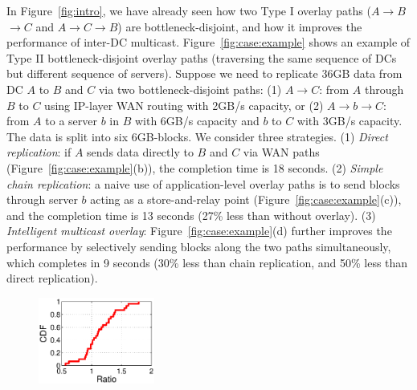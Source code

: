 In Figure~\ref{fig:intro}, we have already seen how two Type I overlay 
paths ($A$$\rightarrow$$B$$\rightarrow$$C$ and
$A$$\rightarrow$$C$$\rightarrow$$B$) are bottleneck-disjoint,
and how it improves the performance of inter-DC multicast.
Figure~\ref{fig:case:example} shows an example
of Type II bottleneck-disjoint overlay paths
(traversing the same sequence of DCs but different sequence of 
servers). Suppose we need to replicate 36GB data from DC $A$
to $B$ and $C$ via two bottleneck-disjoint paths:
(1) $A$$\rightarrow$$C$:
from $A$ through $B$ to $C$ using IP-layer WAN routing with
2GB/s capacity, or
(2) $A$$\rightarrow$$b$$\rightarrow$$C$: from $A$ to a server
$b$ in $B$ with
6GB/s capacity and $b$ to $C$ with 3GB/s capacity.
The data is split into six 6GB-blocks.
We consider three strategies.
(1) {\em Direct replication}:
if $A$ sends data directly to $B$ and $C$ via WAN paths
(Figure~\ref{fig:case:example}(b)),
the completion time is 18 seconds.
(2) {\em Simple chain replication}:
a naive use of application-level overlay paths
is to send blocks through server $b$ acting as a
store-and-relay point
(Figure~\ref{fig:case:example}(c)),
and the completion time is 13 seconds (27\% less than without overlay).
(3) {\em Intelligent multicast overlay}:
Figure~\ref{fig:case:example}(d) further improves the performance by
selectively sending blocks along the two paths simultaneously,
which completes in 9 seconds (30\% less than chain replication,
and 50\% less than direct replication).



\begin{figure}[t]
\centering
\includegraphics[width=1.5in]{images/potential_v2.eps}%
\label{fig:case:size}
\vspace{-0.4cm}
\end{figure}

